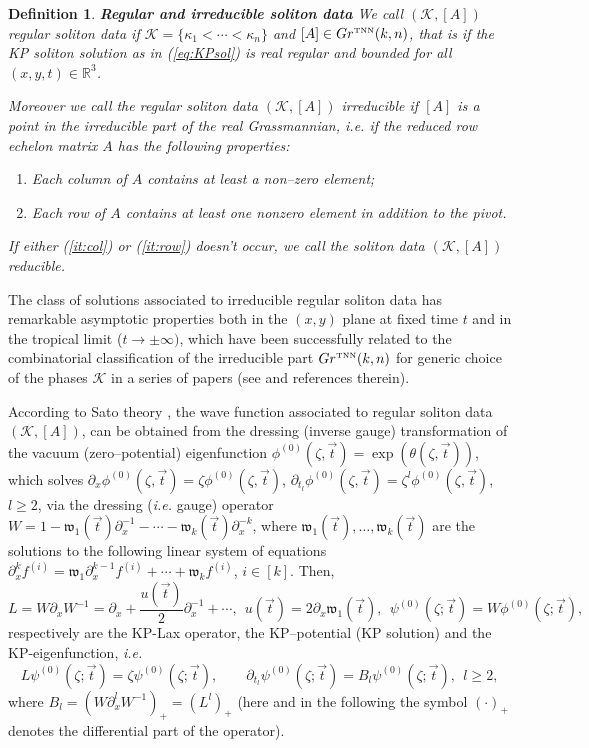 \documentclass[11pt]{amsart}
\theoremstyle{plain}
\numberwithin{equation}{section}
\newtheorem{definition}{Definition}[subsection]
\def \GTNN {{Gr^{\mbox{\tiny TNN}} (k,n)}}
\begin{document}
\begin{definition}\label{def:regsol}{\bf Regular and irreducible soliton data} \cite{CK}
We call $({\mathcal K}, [A])$ regular soliton data if ${\mathcal K} = \{ \kappa_1 < \cdots < \kappa_n \}$ and $[A]\in \GTNN$, that is if the KP soliton solution as in (\ref{eq:KPsol}) is real regular and bounded for all $(x,y,t)\in \mathbb{R}^3$.

Moreover we call the regular soliton data $({\mathcal K}, [A])$ irreducible  if $[A]$ is a point in the irreducible part of the real Grassmannian, {\sl i.e.} if the reduced row echelon matrix $A$ has the following properties:
\begin{enumerate}
\item\label{it:col} Each column of $A$ contains at least a non--zero element;
\item\label{it:row} Each row of $A$ contains at least one nonzero element in addition to the pivot.
\end{enumerate}
If either (\ref{it:col}) or (\ref{it:row}) doesn't occur, we call the soliton data $({\mathcal K}, [A])$ reducible.
\end{definition}

The class of solutions associated to irreducible regular soliton data has remarkable asymptotic properties both in the $(x,y)$ plane at fixed time $t$ and in the tropical limit ($t\to \pm \infty)$, which have been successfully related to the combinatorial classification of the irreducible part $\GTNN$ for generic choice of the phases ${\mathcal K}$ in a series of papers (see \cite{BPPP,CK,DMH,KW1,KW2} and references therein).

According to Sato theory \cite{S}, the wave function associated to regular soliton data $({\mathcal K},[A])$, can be obtained from the dressing (inverse gauge) transformation of the vacuum (zero--potential) eigenfunction $\displaystyle \phi^{(0)} (\zeta, \vec t) =\exp ( \theta(\zeta, {\vec t}))$, which solves
$\partial_x \phi^{(0)} (\zeta, \vec t)=\zeta \phi^{(0)} (\zeta, \vec t)$, 
$\partial_{t_l}\phi^{(0)} (\zeta, \vec t) = \zeta^l \phi^{(0)} (\zeta, \vec t)$, $l\ge 2$,
via the dressing ({\it i.e.} gauge) operator $W = 1 -{\mathfrak w}_1({\vec t})\partial_x^{-1} -\cdots - {\mathfrak w}_k({\vec t})\partial_x^{-k}$,
where ${\mathfrak w}_1({\vec t}),\dots,{\mathfrak w}_k({\vec t})$ are the
solutions to the following linear system of
equations
$\partial_x^k f^{(i)} = {\mathfrak w}_1 \partial_x^{k-1} f^{(i)}+\cdots + {\mathfrak w}_k f^{(i)}$, $i\in [k]$.
Then,
\[
L= W \partial_x W^{-1} = \partial_x + \frac{u(\vec t)}{2}\partial_x^{-1} +\cdots,  \ \
u(\vec t) = 2\partial_x {\mathfrak w}_1 (\vec t), \ \   
\psi^{(0)} (\zeta; \vec t)= W\phi^{(0)} (\zeta; \vec t),
\]
respectively are the KP-Lax operator, the KP--potential (KP solution) and the KP-eigenfunction, {\sl i.e.}
\begin{equation}\label{eq:dress_hier}
L \psi^{(0)} (\zeta; \vec t) =\zeta \psi^{(0)} (\zeta; \vec t), 	\quad\quad
\partial_{t_l}\psi^{(0)} (\zeta; \vec t)= B_l \psi^{(0)} (\zeta; \vec t), \ \ l\ge 2,
\end{equation}
where $B_l = (W \partial_x^l W^{-1} )_+ =(L^l)_+ $ (here and in the following the symbol $(\cdot )_+$ denotes the differential part of the operator).
\end{document}
